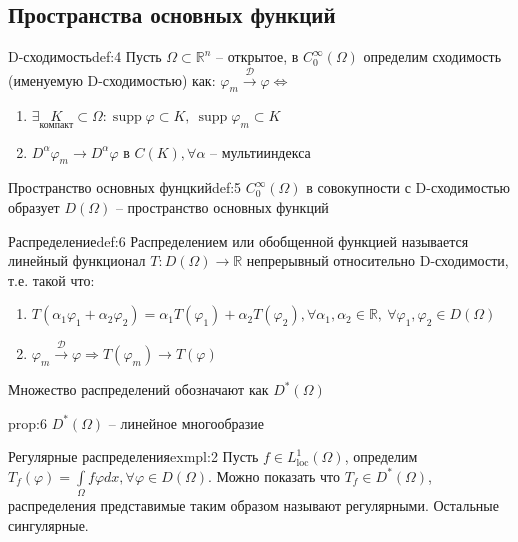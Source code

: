 \documentclass[12pt,a4paper]{article}
\newcommand{\intset}[1]{\int\limits_{#1}}
\newcommand{\Real}{\mathbb{R}}
\newcommand{\Dto}{\overset{\mathcal{D}}{\to}}
\DeclareMathOperator\supp{supp}
\begin{document}
\subsection{Пространства основных функций}

\begin{definition}{D-сходимость}{def:4}
	Пусть $\Omega \subset \Real^n$ -- открытое, в $C_0^\infty (\Omega)$ определим сходимость (именуемую D-сходимостью) как:
	$\varphi_m \Dto \varphi \Leftrightarrow$
	\begin{enumerate}
		\item $\exists \underset{\text{компакт}}{K} \subset \Omega: \supp \varphi \subset K, \ \supp \varphi_m \subset K$
		\item $D^\alpha \varphi_m \to D^\alpha \varphi \text{ в } C(K), \forall \alpha \text { -- мультииндекса}$
	\end{enumerate}
\end{definition}

\begin{definition}{Пространство основных фунцкий}{def:5}
	$C_0^\infty (\Omega)$ в совокупности с D-сходимостью образует $D(\Omega)$ -- пространство основных функций
\end{definition}

\begin{definition}{Распределение}{def:6}
	Распределением или обобщенной функцией называется линейный функционал $T : D(\Omega) \to \Real$ непрерывный относительно D-сходимости, т.е. такой что:
	\begin{enumerate}
		\item $T(\alpha_1 \varphi_1 + \alpha_2 \varphi_2) = \alpha_1 T(\varphi_1) + \alpha_2 T(\varphi_2), \forall \alpha_1, \alpha_2 \in \Real, \ \forall \varphi_1, \varphi_2 \in D(\Omega)$
		\item $\varphi_m \Dto \varphi \Rightarrow T(\varphi_m) \to T(\varphi)$
	\end{enumerate}
	Множество распределений обозначают как $D^* (\Omega)$
\end{definition}

\begin{proposition}{}{prop:6}
	$D^* (\Omega)$ -- линейное многообразие
\end{proposition}

\begin{example}{Регулярные распределения}{exmpl:2}
	Пусть $f \in L_{\text{loc}}^1 (\Omega)$, определим $T_f (\varphi) = \intset{\Omega}{f \varphi dx}, \forall \varphi \in D(\Omega)$. Можно показать что $T_f \in D^* (\Omega)$, распределения представимые таким образом называют регулярными. Остальные сингулярные.
\end{example}
\end{document}
